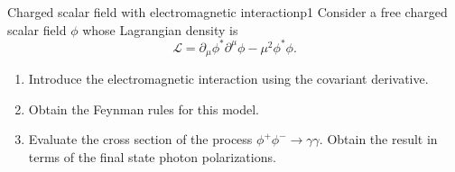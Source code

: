 \begin{problem}{Charged scalar field with electromagnetic interaction}{p1}
   Consider a free charged scalar field \(\phi\) whose Lagrangian density is
   \begin{equation*}
      \mathcal{L} = \partial_\mu \phi^* \partial^\mu \phi - \mu^2 \phi^* \phi.
   \end{equation*}
   \begin{enumerate}[label=(\alph*)]
       \item Introduce the electromagnetic interaction using the covariant derivative.
       \item Obtain the Feynman rules for this model.
       \item Evaluate the cross section of the process \(\phi^+ \phi^- \to \gamma \gamma.\) Obtain the result in terms of the final state photon polarizations.
   \end{enumerate}
\end{problem}
